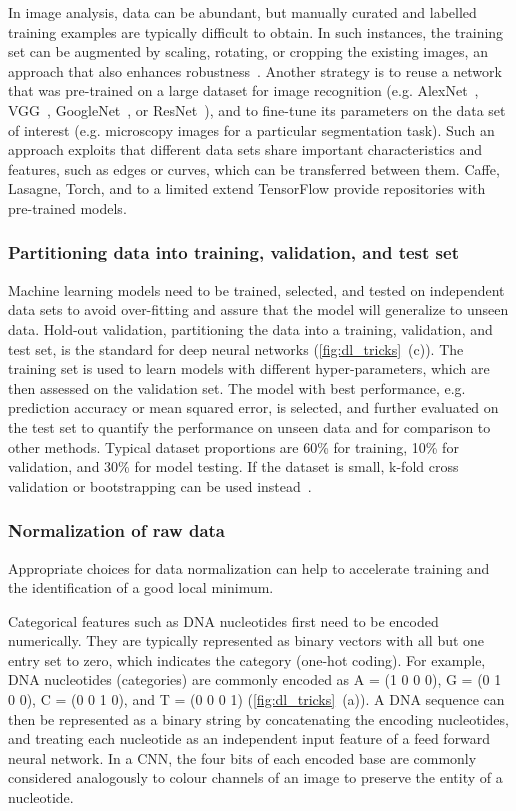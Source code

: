 In image analysis, data can be abundant, but manually curated and labelled training examples are typically difficult to obtain. In such instances, the training set can be augmented by scaling, rotating, or cropping the existing images, an approach that also enhances robustness~\citep{krizhevsky_imagenet_2012}. Another strategy is to reuse a network that was pre-trained on a large dataset for image recognition (e.g. AlexNet~\citep{krizhevsky_imagenet_2012}, VGG~\citep{simonyan_very_2014}, GoogleNet~\citep{szegedy_rethinking_2015}, or ResNet~\citep{he_deep_2015}), and to fine-tune its parameters on the data set of interest (e.g. microscopy images for a particular segmentation task). Such an approach exploits that different data sets share important characteristics and features, such as edges or curves, which can be transferred between them. Caffe, Lasagne, Torch, and to a limited extend TensorFlow provide repositories with pre-trained models.

\subsubsection{Partitioning data into training, validation, and test set}
Machine learning models need to be trained, selected, and tested on independent data sets to avoid over-fitting and assure that the model will generalize to unseen data. Hold-out validation, partitioning the data into a training, validation, and test set, is the standard for deep neural networks (\autoref{fig:dl_tricks}~(c)). The training set is used to learn models with different hyper-parameters, which are then assessed on the validation set. The model with best performance, e.g. prediction accuracy or mean squared error, is selected, and further evaluated on the test set to quantify the performance on unseen data and for comparison to other methods. Typical dataset proportions are 60\% for training, 10\% for validation, and 30\% for model testing. If the dataset is small, k-fold cross validation or bootstrapping can be used instead~\citep{hastie_elements_2005}.

\subsubsection{Normalization of raw data}
Appropriate choices for data normalization can help to accelerate training and the identification of a good local minimum.

Categorical features such as DNA nucleotides first need to be encoded numerically. They are typically represented as binary vectors with all but one entry set to zero, which indicates the category (one-hot coding). For example, DNA nucleotides (categories) are commonly encoded as A = (1 0 0 0), G = (0 1 0 0), C = (0 0 1 0), and T = (0 0 0 1) (\autoref{fig:dl_tricks}~(a)). A DNA sequence can then be represented as a binary string by concatenating the encoding nucleotides, and treating each nucleotide as an independent input feature of a feed forward neural network. In a CNN, the four bits of each encoded base are commonly considered analogously to colour channels of an image to preserve the entity of a nucleotide.

